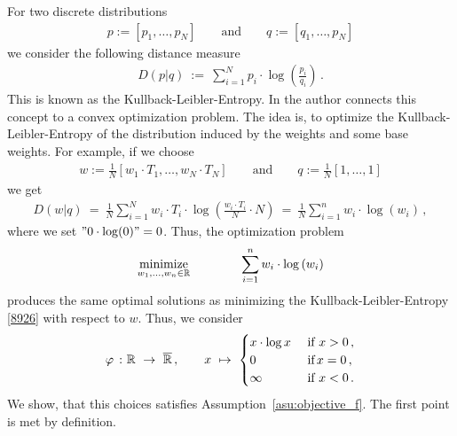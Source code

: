 \begin{example}
  For two discrete distributions
  \begin{gather*}
    p:=[p_1,\ldots,p_N]
    \qquad
    \text{and}
    \qquad
    q:=[q_1,\ldots,p_N]
  \end{gather*}
  we consider the following distance measure
  \begin{gather*}
   D(p|q)
   \ 
   :=
   \ 
   \sum_{i=1}^{N} 
   p_i
   \cdot
   \log
   \left( 
     \frac{p_i}{q_i}
   \right)
   \,.
  \end{gather*}
  This is known as the Kullback-Leibler-Entropy.
  In \cite[§3.1]{Hainmueller2012} the author connects this concept to a convex optimization problem.
  The idea is, to optimize the Kullback-Leibler-Entropy of the distribution induced by the weights and some base weights.
  For example, if we choose
  \begin{gather*}
    w:=
    \frac{1}{N}[w_1\cdot T_1,\ldots,w_N\cdot T_N]
    \qquad
    \text{and}
    \qquad
    q:=\frac{1}{N}[1,\ldots,1]
  \end{gather*}
  we get
  \begin{align}
    \label{8926}
   D(w|q)
   \ 
   =
   \ 
   \frac{1}{N}
   \sum_{i=1}^{N} 
w_i\cdot T_i
   \cdot
   \log
   \left( 
     \frac{w_i\cdot T_i}{N}\cdot N
   \right)
   \ 
   =
   \ 
   \frac{1}{N}
   \sum_{i=1}^{n} 
w_i
   \cdot
   \log
   \left( 
     w_i
   \right)
   \,,
  \end{align}
  where we set $"0\cdot \log(0)"=0$. Thus, the optimization problem
  \begin{gather*}
    \underset{w_1, \ldots, w_n \in \mathbb{R}}
    {\text{minimize}}
    \qquad\qquad
    \sum_{i = 1}^{n} 
w_i
   \cdot
   \log
   \left( 
     w_i
   \right)
  \end{gather*}
  produces the same optimal solutions as minimizing the Kullback-Leibler-Entropy \eqref{8926} with respect to $w$.
Thus, we consider 
\begin{gather*}
  \varphi
  \ 
  \colon
  \R
  \ 
  \to
  \ 
  \overline{\R}
  \,,
  \qquad
  x
  \ 
  \mapsto
  \ 
  \begin{cases}
    x\cdot \log x\ &\text{if}\ x>0\,, \\
    0 \ &\text{if}\, x=0\,,\\
    \infty\ &\text{if}\ x<0\,.
  \end{cases}
\end{gather*}
We show, that this choices satisfies Assumption~\ref{asu:objective_f}.
The first point is met by definition.
\end{example}
